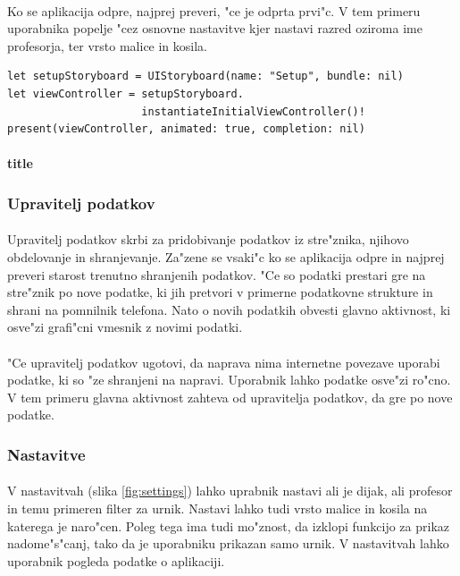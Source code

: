 \paragraph{}Ko se aplikacija odpre, najprej preveri, "ce je odprta prvi"c. V tem primeru uporabnika popelje "cez osnovne nastavitve kjer nastavi razred oziroma ime profesorja, ter vrsto malice in kosila. 

\newpage
\begin{verbatim}
let setupStoryboard = UIStoryboard(name: "Setup", bundle: nil)
let viewController = setupStoryboard.
                     instantiateInitialViewController()!
present(viewController, animated: true, completion: nil)
\end{verbatim}

\paragraph{title}

\subsubsection{Upravitelj podatkov}
\paragraph{}Upravitelj podatkov skrbi za pridobivanje podatkov iz stre"znika, njihovo obdelovanje in shranjevanje. Za"zene se vsaki"c ko se aplikacija odpre in najprej preveri starost trenutno shranjenih podatkov. "Ce so podatki prestari gre na stre"znik po nove podatke, ki jih pretvori v primerne podatkovne strukture in shrani na pomnilnik telefona. Nato o novih podatkih obvesti glavno aktivnost, ki osve"zi grafi"cni vmesnik z novimi podatki.

\paragraph{}"Ce upravitelj podatkov ugotovi, da naprava nima internetne povezave uporabi podatke, ki so "ze shranjeni na napravi. Uporabnik lahko podatke osve"zi ro"cno. V tem primeru glavna aktivnost zahteva od upravitelja podatkov, da gre po nove podatke.

\subsubsection{Nastavitve}
\paragraph{}V nastavitvah (slika \ref{fig:settings}) lahko uprabnik nastavi ali je dijak, ali profesor in temu primeren filter za urnik. Nastavi lahko tudi vrsto malice in kosila na katerega je naro"cen. Poleg tega ima tudi mo"znost, da izklopi funkcijo za prikaz nadome"s"canj, tako da je uporabniku prikazan samo urnik. V nastavitvah lahko uporabnik pogleda podatke o aplikaciji.

